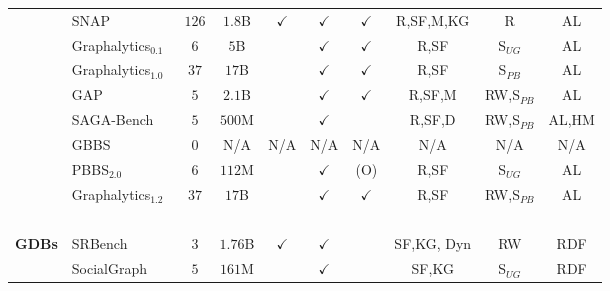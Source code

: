 \begin{landscape}
\begin{table}[htbp]
{\begin{tabular}{ll|cccccccc}
                { ~              }  & { SNAP~\cite{Leskovec2016}                }      &  $126$    &    $1.8$B    & $\checkmark$  & $\checkmark$  & $\checkmark$  & R,SF,M,KG  &  R            &  AL           \\
                { ~              }  & { Graphalytics$_{0.1}$~\cite{Capota2015}  }      &  $6$      &     $5$B     &               & $\checkmark$  & $\checkmark$  & R,SF          & S$_{UG}$      &  AL           \\
                { ~              }  & { Graphalytics$_{1.0}$~\cite{Iosup2016}   }      &  $37$     &    $17$B     &               & $\checkmark$  & $\checkmark$  & R,SF          & S$_{PB}$      &  AL           \\
                { ~              }  & { GAP~\cite{Beamer2017}                   }      &  $5$      &    $2.1$B    &               & $\checkmark$  & $\checkmark$  & R,SF,M        & RW,S$_{PB}$    &  AL           \\
                { ~              }  & { SAGA-Bench~\cite{Basak2020}             }      &  $5$      &    $500$M    &               & $\checkmark$  &               & R,SF,D      & RW,S$_{PB}$    &  AL,HM        \\
                { ~              }  & { GBBS~\cite{Dhulipala2020,Dhulipala2021} }      &  $0$      &      N/A     &     N/A       &     N/A       &    N/A        &      N/A      &     N/A       &  N/A          \\
                { ~              }  & { PBBS$_{2.0}$~\cite{Anderson2022}        }      &  $6$      &    $112$M    &               & $\checkmark$  &     (O)       & R,SF          & S$_{UG}$      &  AL           \\
                { ~              }  & { Graphalytics$_{1.2}$~\cite{Iosup2023}   }      &  $37$     &    $17$B     &               & $\checkmark$  & $\checkmark$  & R,SF          & RW,S$_{PB}$    &  AL           \\
                { ~              }  & { ~                                       }      &           &       ~      &       ~       &       ~       &       ~       &       ~       &       ~       &      ~        \\
                { \textbf{GDBs}  }  & { SRBench~\cite{Zhang2012}                }      &  $3$      &    $1.76$B   & $\checkmark$  & $\checkmark$  &               & SF,KG, Dyn    & RW             &  RDF          \\
                { ~              }  & { SocialGraph~\cite{Angles2013}           }      &  $5$      &    $161$M    &               & $\checkmark$  &               & SF,KG         & S$_{UG}$      &  RDF          \\

\end{tabular}}
\end{table}
\end{landscape}
